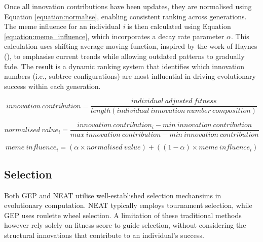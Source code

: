 \parbreak\noindent Once all innovation contributions have been updates, they are normalised using Equation \ref{equation:normalise}, enabling consistent ranking across generations. The meme influence for an individual \textit{i} is then calculated using Equation \ref{equation:meme_influence}, which incorporates a decay rate parameter $\alpha$. This calculation uses shifting average moving function, inspired by the work of Haynes (\cite{haynes2012exponential}), to emphasise current trends while allowing outdated patterns to gradually fade. The result is a dynamic ranking system that identifies which innovation numbers (i.e., subtree configurations) are most influential in driving evolutionary success within each generation.

\parbreak
\begin{ceqn}
\begin{equation}\label{equation:innovation_contribution}
    innovation\:contribution = \frac{individual\:adjusted\:fitness}{length(individual\:innovation\:number\:composition)}
\end{equation}
\end{ceqn}

\parbreak
\begin{ceqn}
	\begin{equation}\label{equation:normalise}
		normalised\:value_i = \frac{innovation\:contribution_i - min\:innovation\:contribution}{max\:innovation\:contribution - min\:innovation\:contribution}
	\end{equation}
\end{ceqn}

\parbreak
\begin{ceqn}
	\begin{equation}\label{equation:meme_influence}
		meme\:influence_i = (\alpha \times normalised\:value) + ((1 - \alpha) \times meme\:influence_i)
	\end{equation}
\end{ceqn}

\subsection{Selection}
Both GEP and NEAT utilise well-established selection mechansims in evolutionary computation. NEAT typically employs tournament selection, while GEP uses roulette wheel selection. A limitation of these traditional methods however rely solely on fitness score to guide selection, without considering the structural innovations that contribute to an individual's success.

